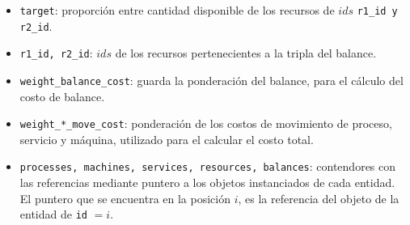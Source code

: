 \documentclass[../informe2.tex]{subfiles}
\begin{document}
\noindent\begin{minipage}{0.5\textwidth}
	\small
	\begin{itemize}[leftmargin=*]
		\item \texttt{target}: proporción entre cantidad disponible de los recursos de $ids$ \texttt{r1\_id y r2\_id}.
		\item \texttt{r1\_id, r2\_id}: $ids$ de los recursos pertenecientes a la tripla del balance.
		\item \texttt{weight\_balance\_cost}: guarda la ponderación del balance, para el cálculo del costo de balance.
	\end{itemize}
\end{minipage}\hfill
\begin{minipage}{0.4\textwidth}
\end{minipage}

\vspace{0.75cm}

\noindent\begin{minipage}{0.35\textwidth}
\end{minipage}\hfill
\begin{minipage}{0.55\textwidth}
	\small
	\begin{itemize}[leftmargin=*]
		\item \texttt{weight\_*\_move\_cost}: ponderación de los costos de movimiento de proceso, servicio y máquina, utilizado para el calcular el costo total.
		\item \texttt{processes, machines, services, resources, balances}: contendores con las referencias mediante puntero a los objetos instanciados de cada entidad. El puntero que se encuentra en la posición $i$, es la referencia del objeto de la entidad de \texttt{id} $=i$.
	\end{itemize}
\end{minipage}
\end{document}
